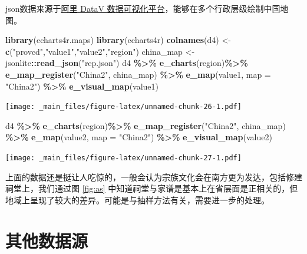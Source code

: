 \documentclass[
]{book}
\newenvironment{Shaded}{\begin{snugshade}}{\end{snugshade}}
\newcommand{\AttributeTok}[1]{\textcolor[rgb]{0.13,0.29,0.53}{#1}}
\newcommand{\FunctionTok}[1]{\textcolor[rgb]{0.13,0.29,0.53}{\textbf{#1}}}
\newcommand{\NormalTok}[1]{#1}
\newcommand{\OtherTok}[1]{\textcolor[rgb]{0.56,0.35,0.01}{#1}}
\newcommand{\SpecialCharTok}[1]{\textcolor[rgb]{0.81,0.36,0.00}{\textbf{#1}}}
\newcommand{\StringTok}[1]{\textcolor[rgb]{0.31,0.60,0.02}{#1}}
\begin{document}
json数据来源于\href{http://datav.aliyun.com/portal/school/atlas/area_selector}{阿里 DataV 数据可视化平台}，能够在多个行政层级绘制中国地图。

\begin{Shaded}
\begin{Highlighting}[]
\FunctionTok{library}\NormalTok{(echarts4r.maps)}
\FunctionTok{library}\NormalTok{(echarts4r)}
\FunctionTok{colnames}\NormalTok{(d4) }\OtherTok{\textless{}{-}} \FunctionTok{c}\NormalTok{(}\StringTok{"provcd"}\NormalTok{,}\StringTok{"value1"}\NormalTok{,}\StringTok{"value2"}\NormalTok{,}\StringTok{"region"}\NormalTok{)}
\NormalTok{china\_map }\OtherTok{\textless{}{-}}\NormalTok{ jsonlite}\SpecialCharTok{::}\FunctionTok{read\_json}\NormalTok{(}\StringTok{"rep.json"}\NormalTok{)}
\NormalTok{d4 }\SpecialCharTok{\%\textgreater{}\%}
  \FunctionTok{e\_charts}\NormalTok{(region)}\SpecialCharTok{\%\textgreater{}\%}
  \FunctionTok{e\_map\_register}\NormalTok{(}\StringTok{"China2"}\NormalTok{, china\_map) }\SpecialCharTok{\%\textgreater{}\%}
  \FunctionTok{e\_map}\NormalTok{(value1, }\AttributeTok{map =} \StringTok{"China2"}\NormalTok{) }\SpecialCharTok{\%\textgreater{}\%}
  \FunctionTok{e\_visual\_map}\NormalTok{(value1)}
\end{Highlighting}
\end{Shaded}

\texttt{[image: \_main\_files/figure-latex/unnamed-chunk-26-1.pdf]}

\begin{Shaded}
\begin{Highlighting}[]
\NormalTok{d4 }\SpecialCharTok{\%\textgreater{}\%}
  \FunctionTok{e\_charts}\NormalTok{(region)}\SpecialCharTok{\%\textgreater{}\%}
  \FunctionTok{e\_map\_register}\NormalTok{(}\StringTok{"China2"}\NormalTok{, china\_map) }\SpecialCharTok{\%\textgreater{}\%}
  \FunctionTok{e\_map}\NormalTok{(value2, }\AttributeTok{map =} \StringTok{"China2"}\NormalTok{) }\SpecialCharTok{\%\textgreater{}\%}
  \FunctionTok{e\_visual\_map}\NormalTok{(value2)}
\end{Highlighting}
\end{Shaded}

\texttt{[image: \_main\_files/figure-latex/unnamed-chunk-27-1.pdf]}

上面的数据还是挺让人吃惊的，一般会认为宗族文化会在南方更为发达，包括修建祠堂上，我们通过图 \ref{fig:as} 中知道祠堂与家谱是基本上在省层面是正相关的，但地域上呈现了较大的差异。可能是与抽样方法有关，需要进一步的处理。

\hypertarget{ux5176ux4ed6ux6570ux636eux6e90}{%
\section{其他数据源}\label{ux5176ux4ed6ux6570ux636eux6e90}}
\end{document}
